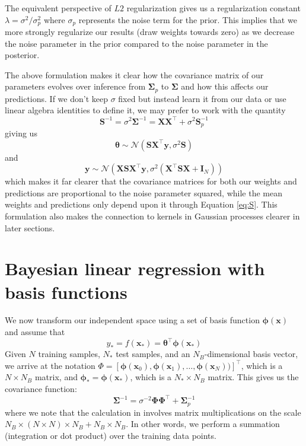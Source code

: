 \documentclass{article}
\begin{document}
The equivalent perspective of $L2$ regularization gives us a regularization constant $\lambda=\sigma^2/\sigma_p^2$ where $\sigma_p$ represents the noise term for the prior. This implies that we more strongly regularize our results (draw weights towards zero) as we decrease the noise parameter in the prior compared to the noise parameter in the posterior. 

The above formulation makes it clear how the covariance matrix of our parameters evolves over inference from $\boldsymbol{\Sigma}_p$ to $\boldsymbol{\Sigma}$ and how this affects our predictions. If we don't keep $\sigma$ fixed but instead learn it from our data or use linear algebra identities to define it, we may prefer to work with the quantity 
\begin{equation}
\label{eq:S}
    \mathbf{S}^{-1} = \sigma^2\boldsymbol{\Sigma}^{-1}=\mathbf{XX}^\top + \sigma^2\mathbf{S}_p^{-1}
\end{equation}
giving us
\begin{equation}
    \boldsymbol{\theta}\sim\mathcal{N}( \mathbf{S} \mathbf{X}^\top \mathbf{y},\sigma^2\mathbf{S})
\end{equation} 
and
\begin{equation}
    \mathbf{y}\sim\mathcal{N}\left(\mathbf{X}  \mathbf{S} \mathbf{X}^\top \mathbf{y} ,\sigma^2\left(\mathbf{X}^\top \mathbf{S}\mathbf{X} + \mathbf{I}_N\right)\right)
\end{equation}
which makes it far clearer that the covariance matrices for both our weights and predictions are proportional to the noise parameter squared, while the mean weights and predictions only depend upon it through Equation \ref{eq:S}. This formulation also makes the connection to kernels in Gaussian processes clearer in later sections.


\section{Bayesian linear regression with basis functions}

We now transform our independent space using a set of basis function $\boldsymbol{\phi}(\mathbf{x})$ and assume that
\begin{equation}
    y_\ast=f(\mathbf{x_\ast})=\boldsymbol{\theta}^\top\boldsymbol{\phi}(\mathbf{x_\ast})
\end{equation} 
Given $N$ training samples, $N_\ast$ test samples, and an $N_B$-dimensional basis vector, we arrive at the notation $\Phi=[\boldsymbol{\phi}(\mathbf{x}_0),\boldsymbol{\phi}(\mathbf{x}_1),\dots,\boldsymbol{\phi}(\mathbf{x}_{N}))]^\top$, which is a $N \times N_B$ matrix, and  $\boldsymbol{\phi}_\ast=\boldsymbol{\phi}(\mathbf{x}_\ast)$, which is a $N_\ast \times N_B$ matrix. This gives us the covariance function:
\begin{equation}
\label{covariance_matrix}
    \boldsymbol{\Sigma}^{-1} = \sigma^{-2} \boldsymbol{\Phi}  \boldsymbol{\Phi}^\top +  \boldsymbol{\Sigma}_p^{-1}
\end{equation} 
where we note that the calculation in involves matrix multiplications on the scale $N_B \times (N \times N) \times N_B + N_B \times N_B$. In other words, we perform a summation (integration or dot product) over the training data points.
\end{document}
